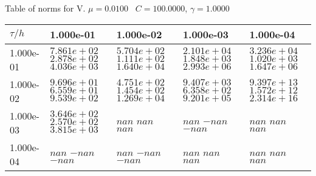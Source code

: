 \begin{center}
Table of norms for V. $\mu = 0.0100$ \, $C = 100.0000$, $\gamma = 1.0000$
  
\begin{tabular}{|p{1in}|p{1in}|p{1in}|p{1in}|p{1in}|} \hline
$\tau / h$ &1.000e-01 &1.000e-02 &1.000e-03 &1.000e-04 \\ \hline 
1.000e-01 & $7.861e+02$  $2.878e+02$  $4.036e+03$  & $5.704e+02$  $1.111e+02$  $1.640e+04$  & $2.101e+04$  $1.848e+03$  $2.993e+06$  & $3.236e+04$  $1.020e+03$  $1.647e+06$  \\ \hline 
1.000e-02 & $9.696e+01$  $6.559e+01$  $9.539e+02$  & $4.751e+02$  $1.454e+02$  $1.269e+04$  & $9.407e+03$  $6.358e+02$  $9.201e+05$  & $9.397e+13$  $1.572e+12$  $2.314e+16$  \\ \hline 
1.000e-03 & $3.646e+02$  $2.570e+02$  $3.815e+03$  & $nan$  $nan$  $nan$  & $nan$  $-nan$  $-nan$  & $nan$  $nan$  $nan$  \\ \hline 
1.000e-04 & $nan$  $-nan$  $-nan$  & $nan$  $-nan$  $-nan$  & $nan$  $nan$  $nan$  & $nan$  $nan$  $nan$  \\ \hline 

\end{tabular}\\[20pt]
\end{center}
